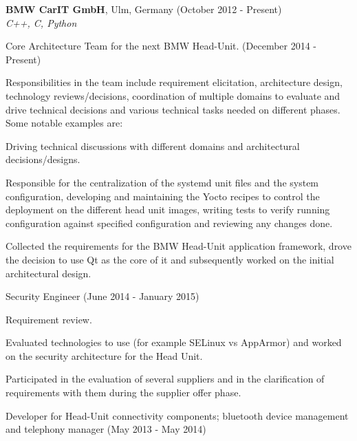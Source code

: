 \documentclass[alan.tex]{subfiles}
\begin{document}
  \item \textbf{BMW CarIT GmbH}, Ulm, Germany (October 2012 - Present)\\
    \emph{C++, C, Python}
    \begin{my_desc}
      \item[Core Architecture Team] for the next BMW Head-Unit. (December 2014 - Present)
        \begin{my_bullets}
          \item Responsibilities in the team include requirement elicitation, architecture design,
            technology reviews/decisions, coordination of multiple domains to evaluate and drive technical
            decisions and various technical tasks needed on different phases. Some notable examples are:
            \begin{my_bullets}
            \item Driving technical discussions with different domains and architectural decisions/designs.
            \item Responsible for the centralization of the systemd unit files and the system configuration,
              developing and maintaining the Yocto recipes to control the deployment on the different head
              unit images, writing tests to verify running configuration against specified configuration and
              reviewing any changes done.
            \item Collected the requirements for the BMW Head-Unit application framework, drove the decision
                to use Qt as the core of it and subsequently worked on the initial architectural design.
            \end{my_bullets}
        \end{my_bullets}
      \item[Security Engineer] (June 2014 - January 2015)
        \begin{my_bullets}
          \item Requirement review.
          \item Evaluated technologies to use (for example SELinux vs AppArmor) and worked on the security architecture
            for the Head Unit.
          \item Participated in the evaluation of several suppliers and in the clarification of requirements with
            them during the supplier offer phase.
        \end{my_bullets}
      \item[Developer] for Head-Unit connectivity components; bluetooth device management and telephony manager (May 2013 - May 2014)

\end{my_desc}
\end{document}
